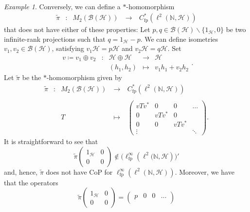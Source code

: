 \documentclass[a4paper]{amsart}
\newcommand{\myhyp}{\textnormal{-}\hskip0pt\relax}
\numberwithin{equation}{section}
\newcommand{\N}{\mathbb{N}}
\newcommand{\Bcal}{\mathcal{B}}
\newcommand{\Hcal}{\mathcal{H}}
\newcommand{\bop}[1]{\Bcal({#1})}
\newcommand{\Cfp}[1]{C^{\ast}_{\mathrm{fp}}({#1})}
\newcommand{\CfpCartan}[1]{\ell^{\infty}_{\mathrm{fp}}({#1})}
\newcommand{\rAr}{\longrightarrow}
\newcommand{\CoProp}[1]{CoP for ${#1}$}
\theoremstyle{plain}
\theoremstyle{indented}
\numberwithin{equation}{section}
\theoremstyle{definition}
\theoremstyle{remark}
\newtheorem{example}[thm]{Example}
\theoremstyle{plain}
\theoremstyle{definition}
\begin{document}
\begin{example}
    Conversely,
    we can define a
     $\ast$\myhyp{}homomorphism 
    \[\begin{array}{ccccc}
        \widetilde{\pi} & \colon & M_2(\bop{\Hcal}) 
        &~\rAr~& 
        \Cfp{\ell^2(\N, \Hcal)}
    \end{array}\]
    that does not have either of these properties:
    Let ${p, q \in \bop{\Hcal} \backslash \{1_{\Hcal} , 0\}}$ be two infinite\myhyp{}rank projections such that ${q = 1_{\Hcal} - p }$. 
    We can define isometries ${v_1, v_2 \in \bop{\Hcal}}$, satisfying ${v_1 \Hcal = p\Hcal}$ and ${v_2 \Hcal = q\Hcal}$.
    Set
    \[\begin{array}{ccccc}
        v \coloneq v_1 \oplus v_2& \colon & \Hcal  \oplus  \Hcal & \rAr & \Hcal\\
        & & (h_1, h_2 ) & \longmapsto &  v_1 h_1 + v_2 h_2 
    \end{array}.\] 
    Let ${\widetilde{\pi}}$
    be the $\ast$\myhyp{}homomorphism given by
    \[\begin{array}{ccccc}
       \widetilde{\pi} & \colon & M_2(\bop{\Hcal}) 
        &~\rAr~& 
        \Cfp{\ell^2(\N, \Hcal)}\\
        \\
        &  & T \phantom{\Hcal))}
        &~\longmapsto~&
        \begin{pmatrix}
            v T v^\ast  & 0             & 0 & \hdots\\
            0           & v T v^\ast    & 0 &  \\
            0           & 0             & v T v^\ast     &  \\
            \vdots       &     &  & \ddots 
        \end{pmatrix} .
    \end{array}\]
    It is straightforward to see that
    \[\widetilde{\pi} \begin{pmatrix}
        1_{\Hcal} & 0 \\
        0 & 0 
    \end{pmatrix}  \notin \big(\CfpCartan{\ell^2(\N, \Hcal}\big)'\]
    and, hence,
    ${\widetilde{\pi}}$ does not have 
    \CoProp{\CfpCartan{\ell^2(\N, \Hcal)}}.
    Moreover, 
    we have that the operators
   \[\widetilde{\pi} \begin{pmatrix}
        1_{\Hcal} & 0 \\
        0 & 0 
    \end{pmatrix} = \begin{pmatrix}
            p  & 0             & 0 & \hdots\\

\end{pmatrix}\]
\end{example}
\end{document}
